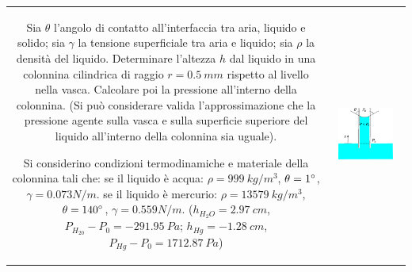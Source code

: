 \noindent
\begin{tabular}{cc}
\begin{minipage}[b]{0.65\textwidth}
\begin{exerciseS}[Capillare]
Sia $\theta$ l'angolo di contatto all'interfaccia tra aria, liquido e solido; 
sia $\gamma$ la tensione superficiale tra aria e liquido; sia $\rho$ la densità del liquido.
Determinare l'altezza $h$ dal liquido in una colonnina cilindrica di raggio $r = 0.5 \ mm$  rispetto al livello
nella vasca. Calcolare poi la pressione all'interno della colonnina.
(Si può considerare valida l'approssimazione che la pressione agente sulla vasca e sulla superficie
superiore del liquido all'interno della colonnina sia uguale).

\vspace{0.1cm}
Si considerino condizioni termodinamiche e materiale della colonnina tali che:
se il liquido è acqua: $\rho = 999 \ kg/m^3$, $\theta={1}\degree$, $\gamma=0.073 N/m$.
se il liquido è mercurio: $\rho = 13579 \ kg/m^3$, $\theta={140}\degree$, $\gamma=0.559 N/m$.
($h_{H_2O} = 2.97 \ cm$, $P_{H_20} - P_0 =  - 291.95 \ Pa$; $h_{Hg} = -1.28 \ cm$, $P_{Hg} - P_0 =  1712.87 \ Pa$)
\end{exerciseS}
\end{minipage}
&
\begin{minipage}[b]{0.35\textwidth}
   \begin{center}
   \includegraphics[width=0.80\textwidth]{./fig/cap01.eps}
   \end{center}
\end{minipage}
\end{tabular}

